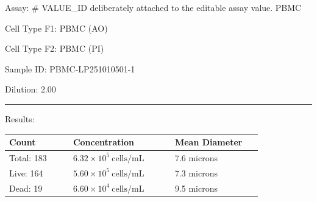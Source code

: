 \documentclass[UTF8,10pt,a4paper,fontset=fandol]{ctexart}
\newcommand{\fieldvalue}[1]{#1}
\begin{document}

\newpage

Assay: %
# VALUE_ID deliberately attached to the editable assay value.
\fieldvalue{PBMC}

\medskip

Cell Type F1: %
\fieldvalue{PBMC (AO)}

\par
Cell Type F2: %
\fieldvalue{PBMC (PI)}

\medskip

Sample ID: %
\fieldvalue{PBMC-LP251010501-1}

\par
Dilution: %
\fieldvalue{2.00}

\bigskip
\noindent\rule{\linewidth}{0.4pt}

\medskip
Results:

\medskip
\begin{tabular}{@{}p{0.22\linewidth}p{0.35\linewidth}p{0.30\linewidth}@{}}
\textbf{Count} & \textbf{Concentration} & \textbf{Mean Diameter} \\
\hline
Total: %
\fieldvalue{183}
&
\fieldvalue{$6.32 \times 10^{5}\ \mathrm{cells/mL}$}
&
\fieldvalue{7.6 microns}
\\
Live: %
\fieldvalue{164}
&
\fieldvalue{$5.60 \times 10^{5}\ \mathrm{cells/mL}$}
&
\fieldvalue{7.3 microns}
\\
Dead: %
\fieldvalue{19}
&
\fieldvalue{$6.60 \times 10^{4}\ \mathrm{cells/mL}$}
&
\fieldvalue{9.5 microns}
\end{tabular}

\medskip
\end{document}
